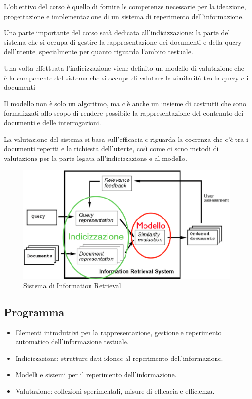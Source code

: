 L'obiettivo del corso è quello di fornire le competenze necessarie per la ideazione, progettazione e implementazione di un sistema di reperimento dell'informazione.

Una parte importante del corso sarà dedicata all'indicizzazione: la parte del sistema che si occupa di gestire la rappresentazione dei documenti e della query dell'utente, specialmente per quanto riguarda l'ambito testuale.

Una volta effettuata l'indicizzazione viene definito un modello di valutazione che è la componente del sistema che si occupa di valutare la similarità tra la query e i documenti.

Il modello non è solo un algoritmo, ma c'è anche un insieme di costrutti che sono formalizzati allo scopo di rendere possibile la rappresentazione del contenuto dei documenti e delle interrogazioni. 

La valutazione del sistema si basa sull'efficacia e riguarda la coerenza che c'è tra i documenti reperiti e la richiesta dell'utente, così come ci sono metodi di valutazione per la parte legata all'indicizzazione e al modello.

\begin{figure}[htbp]
	\centering
	\includegraphics[width=.6\textwidth]{images/l1-irs.png}
	\caption{Sistema di Information Retrieval}
\end{figure}

\subsection{Programma}

\begin{itemize}
	\item Elementi introduttivi per la rappresentazione, gestione e reperimento automatico dell'informazione testuale.
	\item Indicizzazione: strutture dati idonee al reperimento dell'informazione.
	\item Modelli e sistemi per il reperimento dell'informazione.
	\item Valutazione: collezioni sperimentali, misure di efficacia e efficienza.
\end{itemize}
